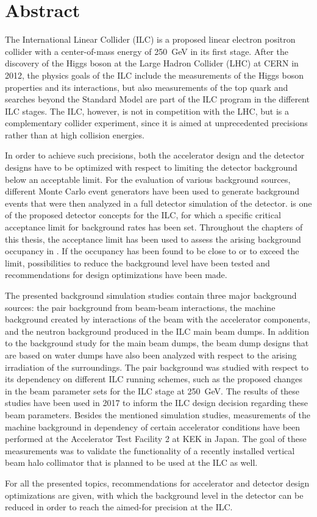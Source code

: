 \chapter*{Abstract}
The International Linear Collider (ILC) is a proposed linear electron positron collider with a center-of-mass energy of \SI{250}{\GeV} in its first stage.
After the discovery of the Higgs boson at the Large Hadron Collider (LHC) at CERN in 2012, the physics goals of the ILC include the measurements of the Higgs boson properties and its interactions, but also measurements of the top quark and searches beyond the Standard Model are part of the ILC program in the different ILC stages.
The ILC, however, is not in competition with the LHC, but is a complementary collider experiment, since it is aimed at unprecedented precisions rather than at high collision energies.

In order to achieve such precisions, both the accelerator design and the detector designs have to be optimized with respect to limiting the detector background below an acceptable limit.
For the evaluation of various background sources, different Monte Carlo event generators have been used to generate background events that were then analyzed in a full detector simulation of the \sid detector.
\sid is one of the proposed detector concepts for the ILC, for which a specific critical acceptance limit for background rates has been set.
Throughout the chapters of this thesis, the acceptance limit has been used to assess the arising background occupancy in \sid.
If the occupancy has been found to be close to or to exceed the limit, possibilities to reduce the background level have been tested and recommendations for design optimizations have been made.

The presented background simulation studies contain three major background sources: the \positron\electron pair background from beam-beam interactions, the machine background created by interactions of the beam with the accelerator components, and the neutron background produced in the ILC main beam dumps.
In addition to the background study for the main beam dumps, the beam dump designs that are based on water dumps have also been analyzed with respect to the arising irradiation of the surroundings.
The pair background was studied with respect to its dependency on different ILC running schemes, such as the proposed changes in the beam parameter sets for the ILC stage at \SI{250}{\GeV}.
The results of these studies have been used in 2017 to inform the ILC design decision regarding these beam parameters.
Besides the mentioned simulation studies, measurements of the machine background in dependency of certain accelerator conditions have been performed at the Accelerator Test Facility 2 at KEK in Japan.
The goal of these measurements was to validate the functionality of a recently installed vertical beam halo collimator that is planned to be used at the ILC as well.

For all the presented topics, recommendations for accelerator and detector design optimizations are given, with which the background level in the \sid detector can be reduced in order to reach the aimed-for precision at the ILC.